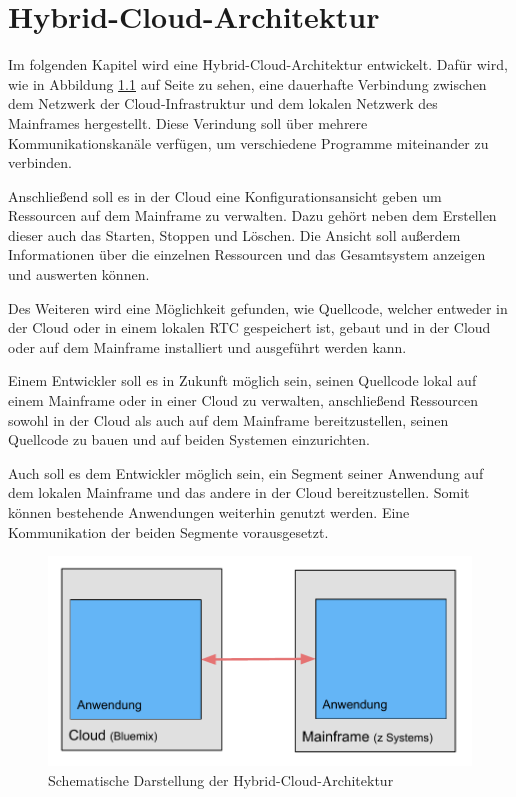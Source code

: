 \chapter{Hybrid-Cloud-Architektur}
\label{cha:hybrid_cloud_architektur}

Im folgenden Kapitel wird eine Hybrid-Cloud-Architektur entwickelt. Dafür wird, wie in Abbildung
\ref{fig:architektur_uebersicht} auf Seite \pageref{fig:architektur_uebersicht} zu sehen, eine dauerhafte Verbindung
zwischen dem Netzwerk der Cloud-Infrastruktur und dem lokalen Netzwerk des Mainframes hergestellt. Diese Verindung soll
über mehrere Kommunikationskanäle verfügen, um verschiedene Programme miteinander zu verbinden.

Anschließend soll es in der Cloud eine Konfigurationsansicht geben um Ressourcen auf dem Mainframe zu verwalten. Dazu
gehört neben dem Erstellen dieser auch das Starten, Stoppen und Löschen. Die Ansicht soll außerdem Informationen über
die einzelnen Ressourcen und das Gesamtsystem anzeigen und auswerten können.

Des Weiteren wird eine Möglichkeit gefunden, wie Quellcode, welcher entweder in der Cloud oder in einem lokalen RTC
gespeichert ist, gebaut und in der Cloud oder auf dem Mainframe installiert und ausgeführt werden kann.

Einem Entwickler soll es in Zukunft möglich sein, seinen Quellcode lokal auf einem Mainframe oder in einer Cloud zu
verwalten, anschließend Ressourcen sowohl in der Cloud als auch auf dem Mainframe bereitzustellen, seinen Quellcode zu
bauen und auf beiden Systemen einzurichten.

Auch soll es dem Entwickler möglich sein, ein Segment seiner Anwendung auf dem lokalen Mainframe und das andere in der
Cloud bereitzustellen. Somit können bestehende Anwendungen weiterhin genutzt werden. Eine Kommunikation der beiden
Segmente vorausgesetzt.

\begin{figure}[h]
  \centering
    \includegraphics[scale=0.5]{images/kapitel_3/architektur_uebersicht.pdf}
  \caption{Schematische Darstellung der Hybrid-Cloud-Architektur}
  \label{fig:architektur_uebersicht}
\end{figure}